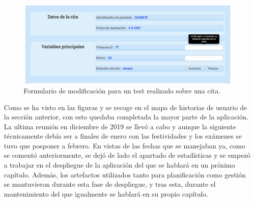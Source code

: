 \begin{figure}[h]
    \centering
     \includegraphics[width=1\textwidth]{images/modificarCita.jpg}
    \caption{Formulario de modificación para un test realizado sobre una cita.}
\end{figure}

Como se ha visto en las figuras y se recoge en el mapa de historias de usuario de la sección anterior, con esto quedaba completada la mayor parte de la aplicación. La ultima reunión en diciembre de 2019 se llevó a cabo y aunque la siguiente técnicamente debía ser a finales de enero con las festividades y los exámenes se tuvo que posponer a febrero. En vistas de las fechas que se manejaban ya, como se comentó anteriormente, se dejó de lado el apartado de estadísticas y se empezó a trabajar en el despliegue de la aplicación del que se hablará en un próximo capítulo. Además, los artefactos utilizados tanto para planificación como gestión se mantuvieron durante esta fase de despliegue, y tras esta, durante el mantenimiento del que igualmente se hablará en su propio capítulo.